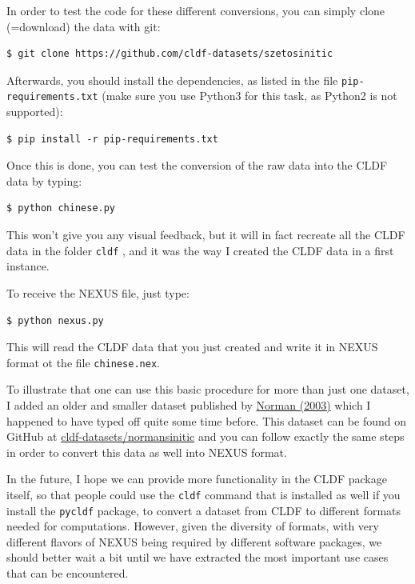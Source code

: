\documentclass[
  english,
  a4paper,
  oneside,tablecaptionabove
]{scrbook}
\newcommand{\passthrough}[1]{#1}
\begin{document}
In order to test the code for these different conversions, you can
simply clone (=download) the data with git:

\begin{lstlisting}
$ git clone https://github.com/cldf-datasets/szetosinitic
\end{lstlisting}

Afterwards, you should install the dependencies, as listed in the file
\passthrough{\lstinline!pip-requirements.txt!} (make sure you use
Python3 for this task, as Python2 is not supported):

\begin{lstlisting}
$ pip install -r pip-requirements.txt
\end{lstlisting}

Once this is done, you can test the conversion of the raw data into the
CLDF data by typing:

\begin{lstlisting}
$ python chinese.py
\end{lstlisting}

This won't give you any visual feedback, but it will in fact recreate
all the CLDF data in the folder \passthrough{\lstinline!cldf!} , and it
was the way I created the CLDF data in a first instance.

To receive the NEXUS file, just type:

\begin{lstlisting}
$ python nexus.py
\end{lstlisting}

This will read the CLDF data that you just created and write it in NEXUS
format ot the file \passthrough{\lstinline!chinese.nex!}.

To illustrate that one can use this basic procedure for more than just
one dataset, I added an older and smaller dataset published by
\href{http://bibliography.lingpy.org?key=Normal2003}{Norman (2003)}
which I happened to have typed off quite some time before. This dataset
can be found on GitHub at
\href{https://github.com/cldf-datasets/normansinitic}{cldf-datasets/normansinitic}
and you can follow exactly the same steps in order to convert this data
as well into NEXUS format.

In the future, I hope we can provide more functionality in the CLDF
package itself, so that people could use the
\passthrough{\lstinline!cldf!} command that is installed as well if you
install the \passthrough{\lstinline!pycldf!} package, to convert a
dataset from CLDF to different formats needed for computations. However,
given the diversity of formats, with very different flavors of NEXUS
being required by different software packages, we should better wait a
bit until we have extracted the most important use cases that can be
encountered.
\end{document}
